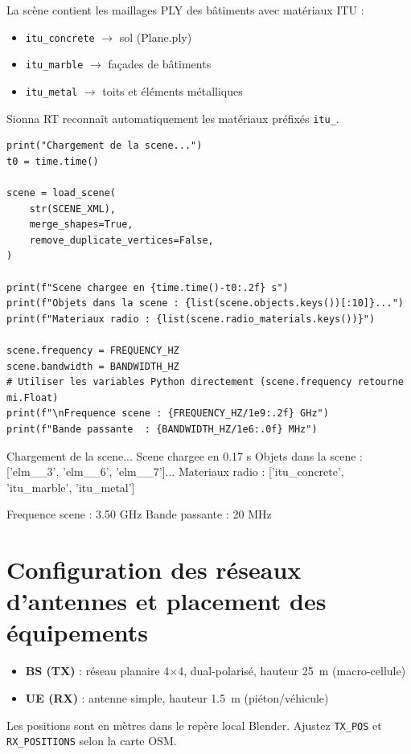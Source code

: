 \documentclass[11pt,a4paper]{article}
\begin{document}
La scène contient les maillages PLY des bâtiments avec matériaux ITU :
\begin{itemize}
    \item \texttt{itu\_concrete} $\to$ sol (Plane.ply)
    \item \texttt{itu\_marble} $\to$ façades de bâtiments
    \item \texttt{itu\_metal} $\to$ toits et éléments métalliques
\end{itemize}
Sionna RT reconnaît automatiquement les matériaux préfixés \texttt{itu\_}.

\begin{lstlisting}
print("Chargement de la scene...")
t0 = time.time()

scene = load_scene(
    str(SCENE_XML),
    merge_shapes=True,
    remove_duplicate_vertices=False,
)

print(f"Scene chargee en {time.time()-t0:.2f} s")
print(f"Objets dans la scene : {list(scene.objects.keys())[:10]}...")
print(f"Materiaux radio : {list(scene.radio_materials.keys())}")

scene.frequency = FREQUENCY_HZ
scene.bandwidth = BANDWIDTH_HZ
# Utiliser les variables Python directement (scene.frequency retourne mi.Float)
print(f"\nFrequence scene : {FREQUENCY_HZ/1e9:.2f} GHz")
print(f"Bande passante  : {BANDWIDTH_HZ/1e6:.0f} MHz")
\end{lstlisting}

\begin{consoleout}
Chargement de la scene...
Scene chargee en 0.17 s
Objets dans la scene : ['elm__3', 'elm__6', 'elm__7']...
Materiaux radio : ['itu_concrete', 'itu_marble', 'itu_metal']

Frequence scene : 3.50 GHz
Bande passante  : 20 MHz
\end{consoleout}

\section{Configuration des réseaux d'antennes et placement des équipements}

\begin{itemize}
    \item \textbf{BS (TX)} : réseau planaire 4$\times$4, dual-polarisé, hauteur 25~m (macro-cellule)
    \item \textbf{UE (RX)} : antenne simple, hauteur 1.5~m (piéton/véhicule)
\end{itemize}
Les positions sont en mètres dans le repère local Blender. Ajustez \texttt{TX\_POS} et \texttt{RX\_POSITIONS} selon la carte OSM.
\end{document}
